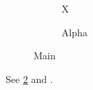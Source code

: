 \documentclass{article}
\begin{document}
\begin{figure}
\begin{subfigure}{0.4\textwidth}X\caption{Alpha}\label{a}\end{subfigure}
\caption{Main}
\end{figure}
See \ref{a} and .
\end{document}
